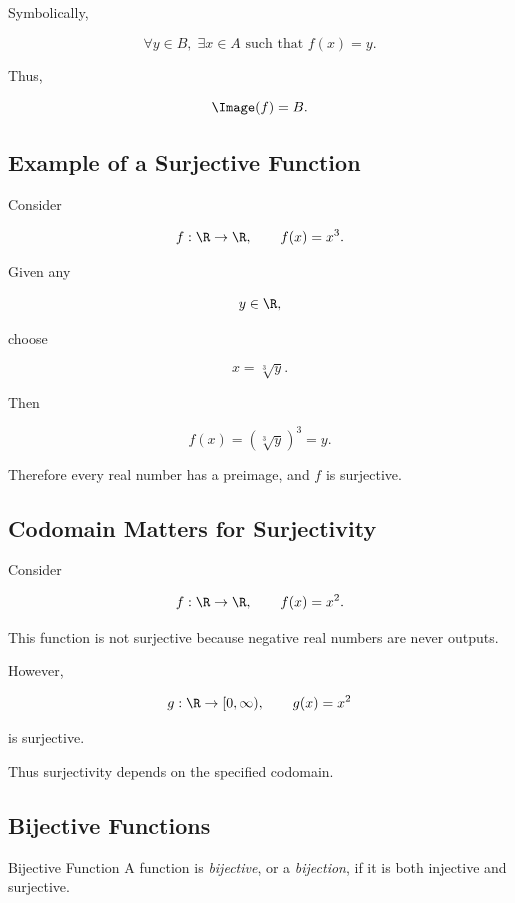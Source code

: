 Symbolically,

\[ \forall y\in B,\;\exists x\in A\text{ such that }f(x)=y. \]

Thus,

\[ \Image(f)=B. \]

\subsection{Example of a Surjective Function}
\label{subsec:surjective-example}

Consider

\[ f:\R\to\R,\qquad f(x)=x^3. \]

Given any

\[ y\in\R, \]

choose

\[ x=\sqrt[3]{y}. \]

Then

\[ f(x)=\left(\sqrt[3]{y}\right)^3=y. \]

Therefore every real number has a preimage, and \(f\) is surjective.

\subsection{Codomain Matters for Surjectivity}
\label{subsec:codomain-surjectivity}

Consider

\[ f:\R\to\R,\qquad f(x)=x^2. \]

This function is not surjective because negative real numbers are never
outputs.

However,

\[ g:\R\to[0,\infty),\qquad g(x)=x^2 \]

is surjective.

Thus surjectivity depends on the specified codomain.

\subsection{Bijective Functions}
\label{subsec:bijective-functions}

\begin{definitionbox}{Bijective Function}
A function is \emph{bijective}, or a \emph{bijection}, if it is both
injective and surjective.
\end{definitionbox}

